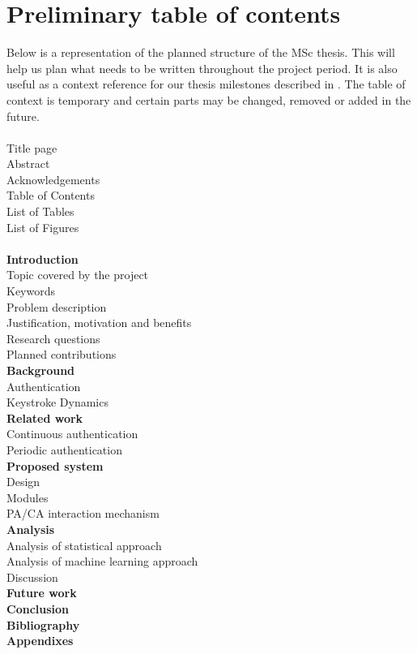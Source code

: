 \documentclass[informationsecurity]{gucmasterproject}
\begin{document}
\section{Preliminary table of contents}
\label{sec:milestones-toc}
Below is a representation of the planned structure of the MSc thesis.
This will help us plan what needs to be written throughout the project period.
It is also useful as a context reference for our thesis milestones described in .
The table of context is temporary and certain parts may be changed, removed or added in the future.
\\\\
\noindent Title page\\
Abstract\\
Acknowledgements\\
Table of Contents\\
List of Tables\\
List of Figures\\
\\
\textbf{Introduction}\\
\indent Topic covered by the project\\
\indent Keywords\\
\indent Problem description\\
\indent Justification, motivation and benefits\\
\indent Research questions\\
\indent Planned contributions\\
\textbf{Background}\\
\indent Authentication\\
\indent Keystroke Dynamics\\
\textbf{Related work}\\
\indent Continuous authentication\\
\indent Periodic authentication\\
\textbf{Proposed system}\\
\indent Design\\
\indent Modules\\
\indent PA/CA interaction mechanism\\
\textbf{Analysis}\\
\indent Analysis of statistical approach\\
\indent Analysis of machine learning approach\\
\indent Discussion\\
\textbf{Future work}\\
\textbf{Conclusion}\\
\textbf{Bibliography}\\
\textbf{Appendixes}
\end{document}
